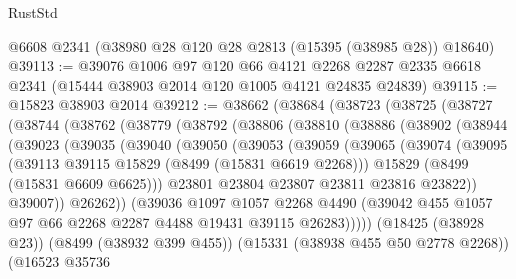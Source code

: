 \begin{lexlean}{RustStd}
\begin{coremodule}
    @6608
    @2341
    (@38980 @28 @120 @28 @2813 (@15395 (@38985 @28)) @18640)
@39113 := @39076
    @1006
    @97
    @120
    @66
    @4121
    @2268
    @2287
    @2335
    @6618
    @2341
    (@15444 @38903 @2014 @120 @1005 @4121 @24835 @24839)
@39115 := @15823 @38903 @2014
@39212 := @38662
    (@38684
      (@38723
        (@38725
          (@38727
            (@38744
              (@38762
                (@38779
                  (@38792
                    (@38806
                      (@38810
                        (@38886
                          (@38902
                            (@38944
                              (@39023
                                (@39035
                                  (@39040
                                    (@39050
                                      (@39053
                                        (@39059
                                          (@39065
                                            (@39074
                                              (@39095
                                                (@39113 @39115 @15829 (@8499 (@15831 @6619 @2268)))
                                                @15829
                                                (@8499 (@15831 @6609 @6625)))
                                              @23801
                                              @23804
                                              @23807
                                              @23811
                                              @23816
                                              @23822))
                                          @39007))
                                      @26262))
                                  (@39036
                                    @1097
                                    @1057
                                    @2268
                                    @4490
                                    (@39042
                                      @455
                                      @1057
                                      @97
                                      @66
                                      @2268
                                      @2287
                                      @4488
                                      @19431
                                      @39115
                                      @26283)))))
                            (@18425 (@38928 @23))
                            (@8499 (@38932 @399 @455))
                            (@15331 (@38938 @455 @50 @2778 @2268))
                            (@16523
                              @35736

\end{coremodule}
\end{lexlean}
